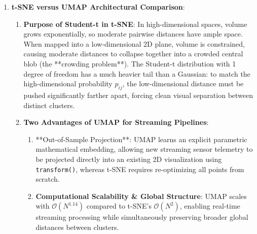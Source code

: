 \begin{enumerate}
\begin{enumerate}[label=(\alph*)]
        \item \textbf{Reconstructed Vector $\hat{\mathbf{x}}$}:
        \begin{equation*}
        \hat{\mathbf{x}} = z \mathbf{v}_1 = (2\sqrt{2}) \left[ \frac{1}{\sqrt{2}}, \ \frac{1}{\sqrt{2}} \right]^T = [2.0, \ 2.0]^T
        \end{equation*}

        \item \textbf{Squared Prediction Error (SPE $e$)}:
        \begin{align*}
        \mathbf{e} &= \mathbf{x} - \hat{\mathbf{x}} = [3.0 - 2.0, \ 1.0 - 2.0]^T = [1.0, \ -1.0]^T \\
        e &= \|\mathbf{e}\|^2 = 1.0^2 + (-1.0)^2 = 1.0 + 1.0 = \mathbf{2.0}
        \end{align*}

        \item \textbf{Threshold Assessment}:
        Because the reconstruction error $e = 2.0$ exceeds the anomaly threshold $\tau = 1.0$, the system flags this reading as an **Anomalous Physical Fault**. The sample violates the correlation structure learned by the principal component subspace.
    \end{enumerate}

    \item \textbf{t-SNE versus UMAP Architectural Comparison}:
    \begin{enumerate}[label=(\alph*)]
        \item \textbf{Purpose of Student-t in t-SNE}:
        In high-dimensional spaces, volume grows exponentially, so moderate pairwise distances have ample space. When mapped into a low-dimensional 2D plane, volume is constrained, causing moderate distances to collapse together into a crowded central blob (the **crowding problem**). 
        The Student-t distribution with 1 degree of freedom has a much heavier tail than a Gaussian: to match the high-dimensional probability $p_{ij}$, the low-dimensional distance must be pushed significantly farther apart, forcing clean visual separation between distinct clusters.

        \item \textbf{Two Advantages of UMAP for Streaming Pipelines}:
        \begin{enumerate}
            \item **Out-of-Sample Projection**: UMAP learns an explicit parametric mathematical embedding, allowing new streaming sensor telemetry to be projected directly into an existing 2D visualization using \texttt{transform()}, whereas t-SNE requires re-optimizing all points from scratch.
            \item \textbf{Computational Scalability \& Global Structure}: UMAP scales with $\mathcal{O}(N^{1.14})$ compared to t-SNE's $\mathcal{O}(N^2)$, enabling real-time streaming processing while simultaneously preserving broader global distances between clusters.
        \end{enumerate}
    \end{enumerate}
\end{enumerate}
